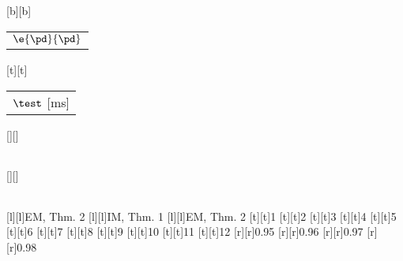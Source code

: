 %    
%
%
%
[b][b]{\fontsize{8}{12}\selectfont \color[rgb]{0,0,0}\setlength{\tabcolsep}{0pt}\begin{tabular}{c}$\e{\pd}{\pd}$\end{tabular}}%
[t][t]{\fontsize{8}{12}\selectfont \color[rgb]{0,0,0}\setlength{\tabcolsep}{0pt}\begin{tabular}{c}$\test$ [ms]\end{tabular}}%
[][]{\fontsize{10}{15}\selectfont \color[rgb]{0,0,0}\setlength{\tabcolsep}{0pt}\begin{tabular}{c} \end{tabular}}%
[][]{\fontsize{10}{15}\selectfont \color[rgb]{0,0,0}\setlength{\tabcolsep}{0pt}\begin{tabular}{c} \end{tabular}}%
[l][l]{\fontsize{8}{12}\selectfont \color[rgb]{0,0,0}EM, Thm. 2}%
[l][l]{\fontsize{8}{12}\selectfont \color[rgb]{0,0,0}IM, Thm. 1}%
[l][l]{\fontsize{8}{12}\selectfont \color[rgb]{0,0,0}EM, Thm. 2}%
%
\fontsize{8}{12}%
\selectfont%
%
[t][t]{1}%
[t][t]{2}%
[t][t]{3}%
[t][t]{4}%
[t][t]{5}%
[t][t]{6}%
[t][t]{7}%
[t][t]{8}%
[t][t]{9}%
[t][t]{10}%
[t][t]{11}%
[t][t]{12}%
%
[r][r]{0.95}%
[r][r]{0.96}%
[r][r]{0.97}%
[r][r]{0.98}%
%
%
